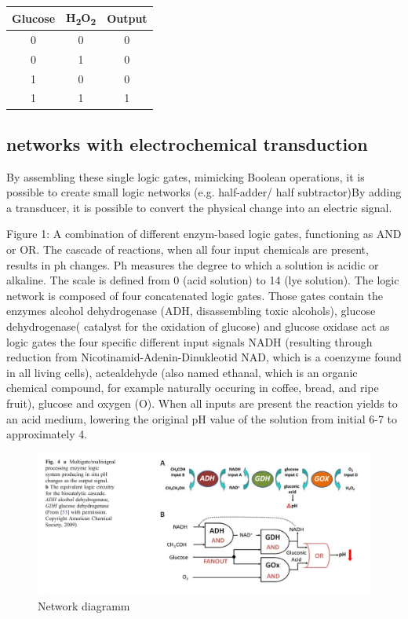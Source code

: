 \documentclass[runningheads]{llncs}
\begin{document}
		\begin{center}
		\begin{tabular}{c|c|c}

			Glucose & H\textsubscript{2}O\textsubscript{2} & Output\\\hline
			0 & 0 & 0\\ 
			0 & 1 & 0\\
			1 & 0 & 0\\
			1 & 1 & 1
		\end{tabular}
		\end{center}
	
\subsection{networks with electrochemical transduction}

		By assembling these single logic gates, mimicking Boolean operations, it is possible to create small logic networks (e.g. half-adder/ half subtractor)By adding a transducer, it is possible to convert the physical change into an electric signal.
	
		Figure 1: A combination of different enzym-based logic gates, functioning as AND or OR. The cascade of reactions, when all four input chemicals are present, results in ph changes. Ph measures the degree to which a solution is acidic or alkaline. The scale is defined from 0 (acid solution) to 14 (lye solution).
		The logic network is composed of four concatenated logic gates. Those gates contain the enzymes alcohol dehydrogenase (ADH, disassembling toxic alcohols), glucose dehydrogenase( catalyst for the oxidation of glucose) and glucose oxidase act as logic gates the four specific different input signals NADH (resulting through reduction from Nicotinamid-Adenin-Dinukleotid NAD, which is a coenzyme found in all living cells),  actealdehyde (also named ethanal, which is an organic chemical compound, for example naturally occuring in coffee, bread, and ripe fruit), glucose and oxygen (O).
	 	When all inputs are present the reaction yields to an acid medium, lowering the original pH value of the solution from initial 6-7 to approximately 4.
		\begin{figure}[H] \centering \includegraphics[scale= 0.3]{pics/biocomputing_sensor.png} \caption{Network diagramm} \label{img:grafik-test} \end{figure}
	
\end{document}

